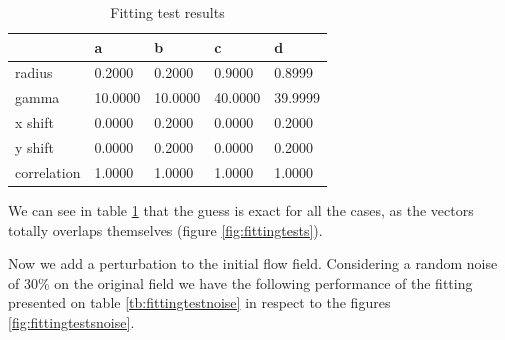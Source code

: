 \documentclass[12pt, a4paper, openany]{memoir}
\begin{document}
\begin{table}[h]
	\centering
	\caption{Fitting test results}
	\vspace{10px}
	\label{tb:fittingtest}
	\begin{tabular}{l|l|l|l|l}
		            & a      & b & c & d \\
		\hline
		radius      & 0.2000   & 0.2000 & 0.9000 & 0.8999  \\
		gamma       & 10.0000 & 10.0000 & 40.0000 & 39.9999 \\
		x shift     & 0.0000  & 0.2000 & 0.0000 & 0.2000 \\
		y shift     & 0.0000  & 0.2000 & 0.0000 & 0.2000 \\ 
		correlation & 1.0000   & 1.0000 & 1.0000 & 1.0000 \\
	\end{tabular}
\end{table}

We can see in table \ref{tb:fittingtest} that the guess is exact for all the cases, as the vectors totally overlaps themselves (figure \ref{fig:fittingtests}).

Now we add a perturbation to the initial flow field. Considering a random noise of 30\% on the original field we have the following performance of the fitting presented on table \ref{tb:fittingtestnoise} in respect to the figures \ref{fig:fittingtestsnoise}.
\end{document}
